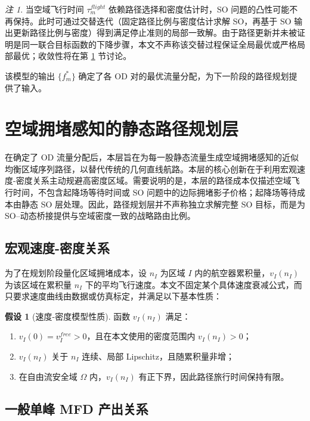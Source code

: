 \documentclass[a4paper,12pt]{article}
\theoremstyle{plain}
\theoremstyle{definition}
\newtheorem{assumption}[theorem]{假设}
\theoremstyle{remark}
\newtheorem{remark}[theorem]{注}
\begin{document}
\begin{remark}
当空域飞行时间 $\tau_m^{flight}$ 依赖路径选择和密度估计时，SO 问题的凸性可能不再保持。此时可通过交替迭代（固定路径比例与密度估计求解 SO，再基于 SO 输出更新路径比例与密度）得到满足停止准则的局部一致解。由于路径更新并未被证明是同一联合目标函数的下降步骤，本文不声称该交替过程保证全局最优或严格局部最优；收敛性将在第 \ref{sec:path_planning} 节讨论。
\end{remark}

该模型的输出 $\{f_m^*\}$ 确定了各 OD 对的最优流量分配，为下一阶段的路径规划提供了输入。

\section{空域拥堵感知的静态路径规划层}\label{sec:path_planning}

在确定了 OD 流量分配后，本层旨在为每一股静态流量生成空域拥堵感知的近似均衡区域序列路径，以替代传统的几何直线航路。本层的核心创新在于利用宏观速度-密度关系主动规避高密度区域。需要说明的是，本层的路径成本仅描述空域飞行时间，不包含起降场等待时间或 SO 问题中的边际拥堵影子价格；起降场等待成本由静态 SO 层处理。因此，路径规划层并不声称独立求解完整 SO 目标，而是为 SO--动态桥接提供与空域密度一致的战略路由比例。

\subsection{宏观速度-密度关系}
为了在规划阶段量化区域拥堵成本，设 $n_I$ 为区域 $I$ 内的航空器累积量，$v_I(n_I)$ 为该区域在累积量 $n_I$ 下的平均飞行速度。本文不固定某个具体速度衰减公式，而只要求速度曲线由数据或仿真标定，并满足以下基本性质：
\begin{assumption}[速度-密度模型性质]\label{asm:speed_density}
函数 $v_I(n_I)$ 满足：
\begin{enumerate}
    \item $v_I(0)=v_{I}^{free}>0$，且在本文使用的密度范围内 $v_I(n_I)>0$；
    \item $v_I(n_I)$ 关于 $n_I$ 连续、局部 Lipschitz，且随累积量非增；
    \item 在自由流安全域 $\Omega$ 内，$v_I(n_I)$ 有正下界，因此路径旅行时间保持有限。
\end{enumerate}
\end{assumption}

\subsection{一般单峰 MFD 产出关系}\label{subsec:mfd_derivation}
\end{document}
